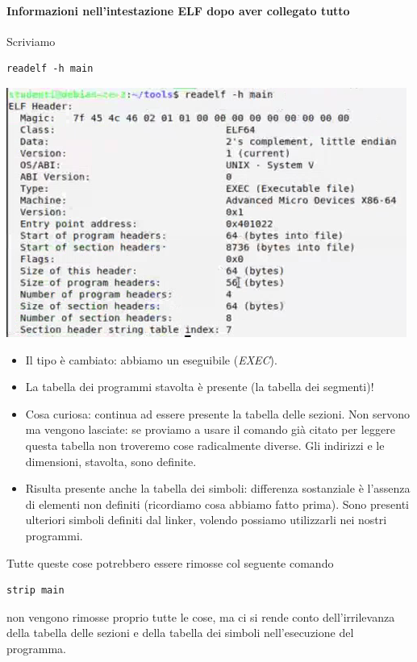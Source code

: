\documentclass[11pt]{report}
\theoremstyle{definition}
\begin{document}
\paragraph{Informazioni nell'intestazione ELF dopo aver collegato tutto} Scriviamo 
\begin{verbatim}
readelf -h main
\end{verbatim}\begin{center}
\includegraphics{img/59.PNG}
\end{center}  
\begin{itemize}
\item Il tipo è cambiato: abbiamo un eseguibile (\emph{EXEC}).
\item La tabella dei programmi stavolta è presente (la tabella dei segmenti)!
\item Cosa curiosa: continua ad essere presente la tabella delle sezioni. Non servono ma vengono lasciate: se proviamo a usare il comando già citato per leggere questa tabella non troveremo cose radicalmente diverse. Gli indirizzi e le dimensioni, stavolta, sono definite.
\item Risulta presente anche la tabella dei simboli: differenza sostanziale è l'assenza di elementi non definiti (ricordiamo cosa abbiamo fatto prima). Sono presenti ulteriori simboli definiti dal linker, volendo possiamo utilizzarli nei nostri programmi.
\end{itemize}
Tutte queste cose potrebbero essere rimosse col seguente comando
\begin{verbatim}
strip main
\end{verbatim}
non vengono rimosse proprio tutte le cose, ma ci si rende conto dell'irrilevanza della tabella delle sezioni e della tabella dei simboli nell'esecuzione del programma.
\end{document}
